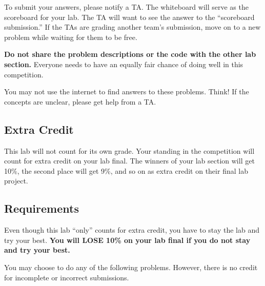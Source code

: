 \documentclass[11pt]{cselabheader}
\theoremstyle{plain}
\begin{document}

To submit your answers, please notify a TA. The whiteboard will serve as the
scoreboard for your lab. The TA will want to see the answer to the ``scoreboard
submission.'' If the TAs are grading another team's submission,  move on to a
new problem while waiting for them to be free.

\textbf{Do not share the problem descriptions or the code with the other lab
section.} Everyone needs to have an equally fair chance of doing well in this
competition.

You may not use the internet to find answers to these problems. Think! If the
concepts are unclear, please get help from a TA.

\subsection{Extra Credit}
This lab will not count for its own grade. Your standing in the competition 
will count for extra credit on your lab final.
The winners of your lab section will get 10\%, the second place will get
9\%, and so on as extra credit on their final lab project. 


\subsection{Requirements}
Even though this lab ``only'' counts for extra credit, you have to stay the lab
and try your best. \textbf{You will LOSE 10\% on your lab final if you do not
stay and try your best.}

You may choose to do any of the following problems. However, there is no credit
for incomplete or incorrect submissions.

\end{document}
